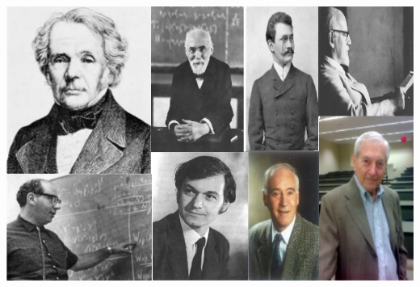 \documentclass[floatfix,aps,prd,amsmath,amssymb]{revtex4}
\begin{document}
\maketitle 
{}

\includegraphics[scale=0.8]{figs/Cover.jpg}

\newpage

\tableofcontents

\newpage









 







\end{document}
